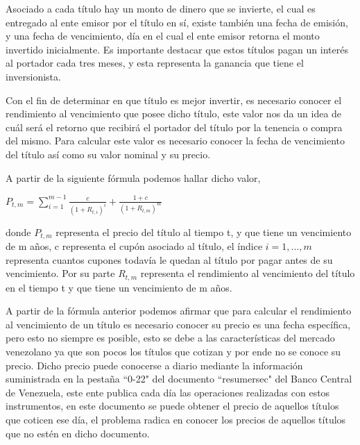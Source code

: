 \vspace{0.5cm}

\hspace*{0.4 cm}Asociado a cada t\'itulo hay un monto de dinero que se invierte, el cual es entregado al ente emisor por el t\'itulo en s\'i, existe tambi\'en una fecha de emisi\'on, y una fecha de vencimiento, d\'ia en el cual el ente emisor retorna el monto invertido inicialmente. Es importante destacar que estos t\'itulos pagan un inter\'es al portador cada tres meses, y esta representa la ganancia que tiene el inversionista.

\vspace{0.5cm}

\hspace*{0.4 cm} Con el fin de determinar en que t\'itulo es mejor invertir, es necesario conocer el rendimiento al vencimiento que posee dicho t\'itulo, este valor nos da un idea de cu\'al ser\'a el retorno que recibir\'a el portador del t\'itulo por la tenencia o compra del mismo. Para calcular este valor es necesario conocer la fecha de vencimiento del t\'itulo as\'i como su valor nominal y su precio.


 \hspace*{0.4 cm} A partir de la siguiente f\'ormula podemos hallar dicho valor,

\vspace{0.5cm}

\begin{center}

$\displaystyle{P_{t,m} = \sum_{i=1}^{m-1}{\frac{c}{(1+R_{t,i})^i} + \frac{1+c}{(1+R_{t,m})^m}} }$

\end{center}

\vspace{0.5cm}

\noindent donde $P_{t,m}$ representa el precio del t\'itulo al tiempo t, y que tiene un vencimiento de m a\~nos, c representa el cup\'on asociado al t\'itulo, el \'indice $i = 1,...,m$ representa cuantos cupones todav\'ia le quedan al t\'itulo por pagar antes de su vencimiento. Por su parte $R_{t,m}$ representa el rendimiento al vencimiento del t\'itulo en el tiempo t y que tiene un vencimiento de m a\~nos.

\vspace{0.5cm}

\hspace*{0.4 cm}A partir de la f\'ormula anterior podemos afirmar que para calcular el rendimiento al vencimiento de un t\'itulo es necesario conocer su precio es una fecha espec\'ifica, pero esto no siempre es posible, esto se debe a las caracter\'isticas del mercado venezolano ya que son pocos los t\'itulos que cotizan y por ende no se conoce su precio. Dicho precio puede conocerse a diario mediante la informaci\'on suministrada en la pesta\~na ``0-22" del documento ``resumersec" del Banco Central de Venezuela, este ente publica cada d\'ia las operaciones realizadas con estos instrumentos, en este documento se puede obtener el precio de aquellos t\'itulos que coticen ese d\'ia, el problema radica en conocer los precios de aquellos t\'itulos que no est\'en en dicho documento.



